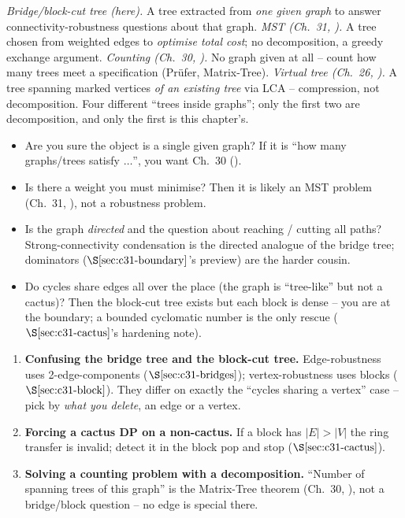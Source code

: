 \begin{comparisonbox}
\emph{Bridge/block-cut tree (here).} A tree extracted from \emph{one given graph} to
answer connectivity-robustness questions about that graph.
\emph{MST (Ch.~31, ).} A tree chosen from weighted edges to \emph{optimise
total cost}; no decomposition, a greedy exchange argument.
\emph{Counting (Ch.~30, ).} No graph given at all -- count how many trees
meet a specification (Prüfer, Matrix-Tree).
\emph{Virtual tree (Ch.~26, ).} A tree spanning marked vertices \emph{of an
existing tree} via LCA -- compression, not decomposition.  Four different ``trees
inside graphs''; only the first two are decomposition, and only the first is this
chapter's.
\end{comparisonbox}

\begin{stuckbox}
\begin{itemize}[nosep,leftmargin=1.4em]
  \item Are you sure the object is a single given graph? If it is ``how many graphs/trees
        satisfy \(\ldots\)'', you want Ch.~30 ().
  \item Is there a weight you must minimise? Then it is likely an MST problem
        (Ch.~31, ), not a robustness problem.
  \item Is the graph \emph{directed} and the question about reaching / cutting all
        paths? Strong-connectivity condensation is the directed analogue of the bridge
        tree; dominators (\(\secref{c31-boundary}\)'s preview) are the harder cousin.
  \item Do cycles share edges all over the place (the graph is ``tree-like'' but not a
        cactus)? Then the block-cut tree exists but each block is dense -- you are at
        the boundary; a bounded cyclomatic number is the only rescue
        (\(\secref{c31-cactus}\)'s hardening note).
\end{itemize}
\end{stuckbox}

\begin{warningbox}
\begin{enumerate}[nosep,leftmargin=1.6em]
  \item \textbf{Confusing the bridge tree and the block-cut tree.} Edge-robustness uses
        2-edge-components (\(\secref{c31-bridges}\)); vertex-robustness uses blocks
        (\(\secref{c31-block}\)).  They differ on exactly the ``cycles sharing a vertex''
        case -- pick by \emph{what you delete}, an edge or a vertex.
  \item \textbf{Forcing a cactus DP on a non-cactus.} If a block has \(|E|>|V|\) the ring
        transfer is invalid; detect it in the block pop and stop (\(\secref{c31-cactus}\)).
  \item \textbf{Solving a counting problem with a decomposition.} ``Number of spanning
        trees of this graph'' is the Matrix-Tree theorem (Ch.~30, ), not a
        bridge/block question -- no edge is special there.
\end{enumerate}
\end{warningbox}


